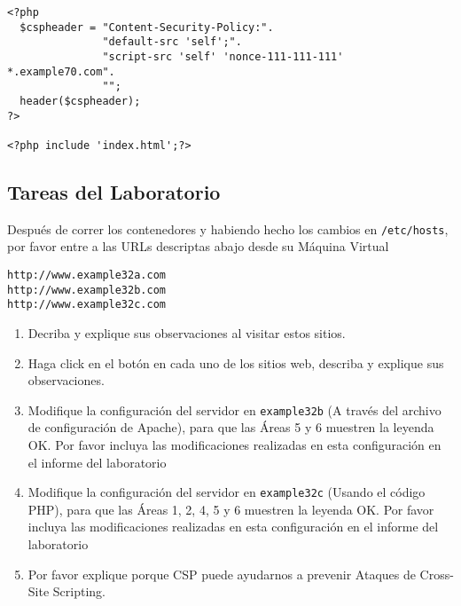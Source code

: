 \begin{lstlisting}
<?php
  $cspheader = "Content-Security-Policy:".
               "default-src 'self';".
               "script-src 'self' 'nonce-111-111-111' *.example70.com".
               "";
  header($cspheader);
?>

<?php include 'index.html';?>
\end{lstlisting}



\subsection{Tareas del Laboratorio} 

Después de correr los contenedores y habiendo hecho los cambios en \texttt{/etc/hosts}, por favor entre a las URLs descriptas abajo desde su Máquina Virtual 

\begin{lstlisting}
http://www.example32a.com
http://www.example32b.com
http://www.example32c.com
\end{lstlisting}

\begin{enumerate}

\item Decriba y explique sus observaciones al visitar estos sitios.

\item Haga click en el botón en cada uno de los sitios web, describa y explique sus observaciones. 

\item Modifique la configuración del servidor en \texttt{example32b} (A través del archivo de configuración de Apache), para que las Áreas 5 y 6 muestren la leyenda OK.
Por favor incluya las modificaciones realizadas en esta configuración en el informe del laboratorio

\item Modifique la configuración del servidor en \texttt{example32c} (Usando el código PHP), para que las  Áreas 1, 2, 4, 5 y 6 muestren la leyenda OK.
Por favor incluya las modificaciones realizadas en esta configuración en el informe del laboratorio

\item Por favor explique porque CSP puede ayudarnos a prevenir Ataques de Cross-Site Scripting.

\end{enumerate}
 




